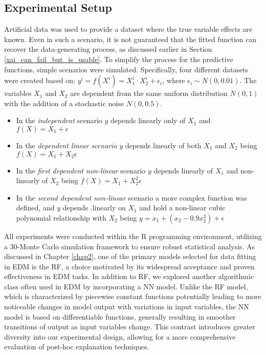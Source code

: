 \subsection{Experimental Setup}

Artificial data was used to provide a dataset where the true variable effects are known. Even in such a scenario, it is not guaranteed that the fitted function can recover the data-generating process, as discussed earlier in Section  \ref{xai_can_fail_but_is_usable}. To simplify the process for the predictive functions, simple scenarios were simulated. Specifically, four different datasets were created based on: $y^{i} = f(X^{i}) = X_{1}^{i} \cdot X_{2}^{i} + \epsilon_i$, where $\epsilon_i \sim N(0, 0.01)$. The variables $X_{1}$ and $X_{2}$ are dependent from the same uniform distribution $N(0,1)$ with the addition of a stochastic noise $N(0, 0.5)$. 

\begin{itemize}
    \item In the \textit{independent} scenario $y$ depends linearly only of $X_{1}$ and $f(X) = X_{1} + \epsilon$
    \item In the \textit{dependent linear scenario} $y$ depends linearly of both $X_{1}$ and $X_{2}$ being $f(X) = X_{1} + X_{2} \epsilon$
    \item In the \textit{first dependent non-linear} scenario $y$ depends linearly of $X_{1}$ and non-linearly of $X_{2}$ being  $f(X) = X_{1} + X_{2}^2 \epsilon$
    \item In the \textit{second dependent non-linear} scenario a more complex function was defined, and $y$ depends
    .linearly on $X_{1}$ and hold a non-linear cubic polynomial relationship with $X_{2}$ being  $y = x_1 + (x_2 - 0.9 x_2^3) + \epsilon$
\end{itemize}

All experiments were conducted within the R programming environment, utilizing a 30-Monte Carlo simulation framework to ensure robust statistical analysis. As discussed in Chapter \ref{chap2}, one of the primary models selected for data fitting in \gls{EDM} is the \gls{RF}, a choice motivated by its widespread acceptance and proven effectiveness in \gls{EDM} tasks. In addition to RF, we explored another algorithmic class often used in \gls{EDM} by incorporating a \gls{NN} model. Unlike the \gls{RF} model, which is characterized by piecewise constant functions potentially leading to more noticeable changes in model output with variations in input variables, the \gls{NN} model is based on differentiable functions, generally resulting in smoother transitions of output as input variables change. This contrast introduces greater diversity into our experimental design, allowing for a more comprehensive evaluation of post-hoc explanation techniques. 

